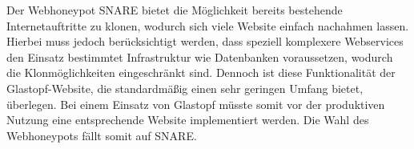 Der Webhoneypot SNARE bietet die Möglichkeit bereits bestehende Internetauftritte zu klonen, wodurch sich viele Website einfach nachahmen lassen. Hierbei muss jedoch berücksichtigt werden, dass speziell komplexere Webservices den Einsatz bestimmtet Infrastruktur wie Datenbanken voraussetzen, wodurch die Klonmöglichkeiten eingeschränkt sind. Dennoch ist diese Funktionalität der Glastopf-Website, die standardmäßig einen sehr geringen Umfang bietet, überlegen. Bei einem Einsatz von Glastopf müsste somit vor der produktiven Nutzung eine entsprechende Website implementiert werden. Die Wahl des Webhoneypots fällt somit auf SNARE.

